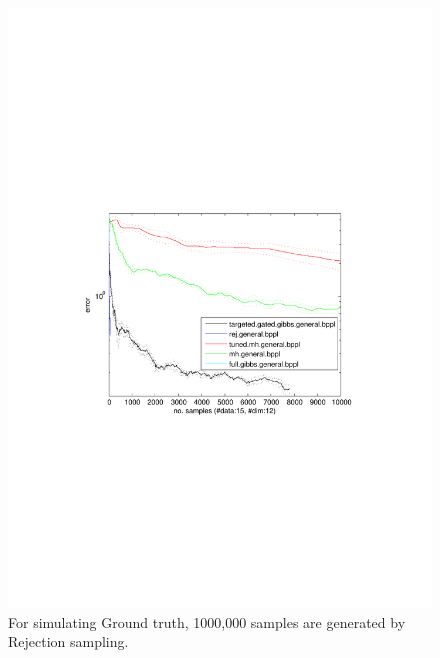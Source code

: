 \begin{figure}%
\centering
\includegraphics[width=1.2\textwidth]{pic1/errVsamplesDim12Data15.pdf}
\caption{\footnotesize For simulating Ground truth, 1000,000 samples are generated by Rejection sampling. }
\label{fig:pref}
\end{figure}
